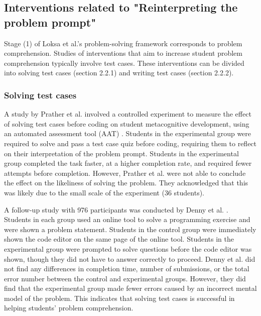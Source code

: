 \documentclass[sigconf,authorversion,nonacm]{acmart}
\begin{document}
\subsection{Interventions related to "Reinterpreting the problem prompt"}
Stage (1) of Loksa et al.’s problem-solving framework corresponds to problem comprehension. Studies of interventions that aim to increase student problem comprehension typically involve test cases. These interventions can be divided into solving test cases (section 2.2.1) and writing test cases (section 2.2.2). 
\subsubsection{Solving test cases}
A study by Prather et al. involved a controlled experiment to measure the effect of solving test cases before coding on student metacognitive development, using an automated assessment tool (AAT) \cite{prather2019}. Students in the experimental group were required to solve and pass a test case quiz before coding, requiring them to reflect on their interpretation of the problem prompt. Students in the experimental group completed the task faster, at a higher completion rate, and required fewer attempts before completion. However, Prather et al. were not able to conclude the effect on the likeliness of solving the problem. They acknowledged that this was likely due to the small scale of the experiment (36 students).

A follow-up study with 976 participants was conducted by Denny et al. \cite{denny2019}. Students in each group used an online tool to solve a programming exercise and were shown a problem statement. Students in the control group were immediately shown the code editor on the same page of the online tool. Students in the experimental group were prompted to solve questions before the code editor was shown, though they did not have to answer correctly to proceed. Denny et al. did not find any differences in completion time, number of submissions, or the total error number between the control and experimental groups. However, they did find that the experimental group made fewer errors caused by an incorrect mental model of the problem. This indicates that solving test cases is successful in helping students’ problem comprehension.
\end{document}
